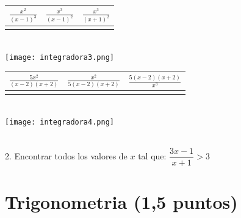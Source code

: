 \documentclass[a4paper,11pt,spanish,sans]{exam}
\newcommand{\Ts}{\rule{0pt}{2.8ex}}       %
\newcommand{\Bs}{\rule[-1.5ex]{0pt}{0pt}} %
\begin{document}
\begin{minipage}{0.5\textwidth}
	\centering
	\label{mc1}
	\begin{tabular}{|c|c|c|}
		\hline
		$\frac{x^2}{(x-1)^3}$  & $\frac{x^3}{(x-1)^2}$ & $\frac{x^3}{(x+1)^2}$ \Ts \Bs   \\ \hline
		&   &      \\ \hline
	\end{tabular}\\
	\centering
	\texttt{[image: integradora3.png]}
\end{minipage}
\begin{minipage}{.5\textwidth}
	\centering
	\begin{tabular}{|c|c|c|}
		\hline
		$\frac{5x^2}{(x-2)(x+2)}$  & $\frac{x^2}{5(x-2)(x+2)}$ & $\frac{5(x-2)(x+2)}{x^3}$ \Ts \Bs   \\ \hline
		&   &      \\ \hline
	\end{tabular}\\
	\centering
	\texttt{[image: integradora4.png]}
\end{minipage}\\


2. Encontrar todos los valores de $x$ tal que: $\dfrac{3x-1}{x+1}>3$
\\

\section{Trigonometria (1,5 puntos)}
\end{document}
